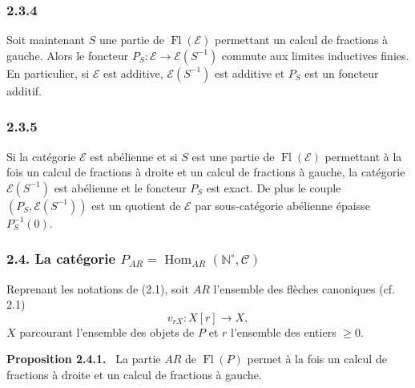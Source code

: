 \documentclass[11pt]{article}
\providecommand{\NN}{\mathbb{N}}
\newenvironment{statement}[1]{\par\medskip\noindent\textbf{#1.}\ }{\par\medskip}
\DeclareMathOperator{\Hom}{Hom}
\providecommand{\Hom}{\operatorname{Hom}}
\providecommand{\Fl}{\operatorname{Fl}}
\providecommand{\NN}{\mathbb N}
\providecommand{\cC}{\mathcal C}
\providecommand{\cE}{\mathcal E}
\providecommand{\cC}{\mathcal C}
\providecommand{\Hom}{\operatorname{Hom}}
\begin{document}
\subsubsection*{2.3.4}
Soit maintenant $S$ une partie de $\Fl(\cE)$ permettant un calcul de fractions à gauche. Alors le foncteur $P_S:\cE\to\cE(S^{-1})$ commute aux limites inductives finies. En particulier, si $\cE$ est additive, $\cE(S^{-1})$ est additive et $P_S$ est un foncteur additif.

\subsubsection*{2.3.5}
Si la catégorie $\cE$ est abélienne et si $S$ est une partie de $\Fl(\cE)$ permettant à la fois un calcul de fractions à droite et un calcul de fractions à gauche, la catégorie $\cE(S^{-1})$ est abélienne et le foncteur $P_S$ est exact. De plus le couple $(P_S,\cE(S^{-1}))$ est un quotient de $\cE$ par sous-catégorie abélienne épaisse $P_S^{-1}(0)$.

\subsubsection*{2.4. La catégorie $P_{AR}=\Hom_{AR}(\NN^\circ,\cC)$}
Reprenant les notations de (2.1), soit $AR$ l'ensemble des flèches canoniques (cf. 2.1)
\[
v_{rX}:X[r]\longrightarrow X,
\]
$X$ parcourant l'ensemble des objets de $P$ et $r$ l'ensemble des entiers $\ge0$.

\begin{statement}{Proposition 2.4.1}
La partie $AR$ de $\Fl(P)$ permet à la fois un calcul de fractions à droite et un calcul de fractions à gauche.
\end{statement}
\end{document}
